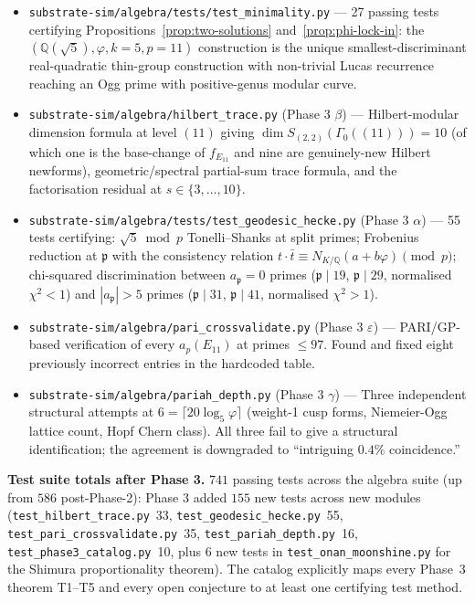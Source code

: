 \documentclass[11pt,a4paper]{article}
\theoremstyle{plain}
\theoremstyle{definition}
\theoremstyle{remark}
\numberwithin{equation}{section}
\providecommand{\Qp}{\ensuremath{\mathbb{Q}(\sqrt{5})}}
\begin{document}
\begin{itemize}
  Heegner $\cap$ Ogg $=\{2,3,7,11,19\}$; pariah Class A vs Class B partition;
  the five-fold convergence at $p=11$.
\item \texttt{substrate-sim/algebra/tests/test\_minimality.py} --- 27 passing tests certifying
  Propositions~\ref{prop:two-solutions} and~\ref{prop:phi-lock-in}: the
  $(\Qp,\varphi,k=5,p=11)$ construction is the unique smallest-discriminant
  real-quadratic thin-group construction with non-trivial Lucas recurrence
  reaching an Ogg prime with positive-genus modular curve.
\item \texttt{substrate-sim/algebra/hilbert\_trace.py} (Phase 3 $\beta$) ---
  Hilbert-modular dimension formula at level $(11)$ giving
  $\dim S_{(2,2)}(\Gamma_{0}((11)))=10$ (of which one is the base-change
  of $f_{E_{11}}$ and nine are genuinely-new Hilbert newforms),
  geometric/spectral partial-sum trace formula, and the factorisation
  residual at $s\in\{3,\dots,10\}$.
\item \texttt{substrate-sim/algebra/tests/test\_geodesic\_hecke.py}
  (Phase 3 $\alpha$) --- 55 tests certifying: $\sqrt{5}\bmod p$
  Tonelli--Shanks at split primes; Frobenius reduction at $\mathfrak p$
  with the consistency relation $t\cdot\bar t \equiv N_{K/\mathbb Q}(a+b\varphi)
  \pmod p$; chi-squared discrimination between $a_{\mathfrak p}=0$ primes
  ($\mathfrak p\mid 19$, $\mathfrak p\mid 29$, normalised $\chi^{2}<1$) and
  $|a_{\mathfrak p}|>5$ primes ($\mathfrak p\mid 31$, $\mathfrak p\mid 41$,
  normalised $\chi^{2}\!\!>\!1$).
\item \texttt{substrate-sim/algebra/pari\_crossvalidate.py}
  (Phase 3 $\varepsilon$) --- PARI/GP-based verification of every
  $a_p(E_{11})$ at primes $\le 97$.  Found and fixed eight previously
  incorrect entries in the hardcoded table.
\item \texttt{substrate-sim/algebra/pariah\_depth.py} (Phase 3 $\gamma$) ---
  Three independent structural attempts at $6=\lceil 20\log_{5}\varphi\rceil$
  (weight-1 cusp forms, Niemeier-Ogg lattice count, Hopf Chern class).
  All three fail to give a structural identification; the agreement
  is downgraded to ``intriguing $0.4\%$ coincidence.''
\end{itemize}

\noindent\textbf{Test suite totals after Phase 3.}  $741$ passing tests
across the algebra suite (up from $586$ post-Phase-2): Phase 3 added
$155$ new tests across new modules (\texttt{test\_hilbert\_trace.py}~33,
\texttt{test\_geodesic\_hecke.py}~55, \texttt{test\_pari\_crossvalidate.py}~35,
\texttt{test\_pariah\_depth.py}~16, \texttt{test\_phase3\_catalog.py}~10,
plus 6 new tests in \texttt{test\_onan\_moonshine.py} for the Shimura
proportionality theorem).  The catalog explicitly maps every Phase~3
theorem T1--T5 and every open conjecture to at least one certifying
test method.
\end{document}
